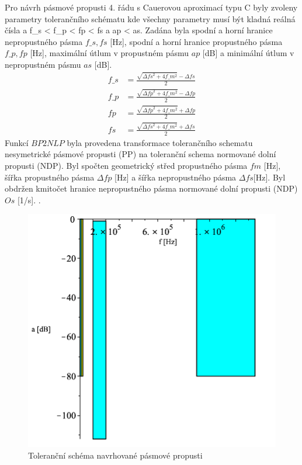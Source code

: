 Pro návrh pásmové propusti 4. řádu s Cauerovou aproximací typu C byly zvoleny parametry tolerančního schématu 
\noindent kde všechny parametry musí být kladná reálná čísla a f\_s <  f\_p < fp < fs a ap < as. Zadána byla spodní a horní hranice nepropustného pásma $f\_s,fs$ [Hz], spodní a horní hranice propustného pásma $f\_p,fp$ [Hz], maximální útlum v propustném pásmu $ap$ [dB] a minimální útlum v nepropustném pásmu $as$ [dB].
\begin{align}
f\_s &= \frac{\sqrt{\Delta{fs}^2+4f\_m ^2}-\Delta{fs}}{2}\\
f\_p &= \frac{\sqrt{\Delta{fp}^2+4f\_m ^2}-\Delta{fp}}{2}\\
fp &= \frac{\sqrt{\Delta{fp}^2+4f\_m ^2}+\Delta{fp}}{2}\\
fs &= \frac{\sqrt{\Delta{fs}^2+4f\_m ^2}+\Delta{fs}}{2}
\end{align}
Funkcí $BP2NLP$ byla provedena transformace tolerančního schematu nesymetrické pásmové propusti (PP) na toleranční schema normované dolní propusti (NDP). Byl spočten geometrický střed propustného pásma $fm$ [Hz], šířka propustného pásma $\Delta{fp}$ [Hz] a šířka nepropustného pásma $\Delta{fs} $[Hz].
\noindent Byl obdržen kmitočet hranice nepropustného pásma normované dolní propusti (NDP) $Os$ [1/s].
.
\begin{figure}[h]
\centering
\includegraphics[scale=0.5]{tolsch2.png}
\caption{Toleranční schéma navrhované pásmové propusti}
\end{figure}
